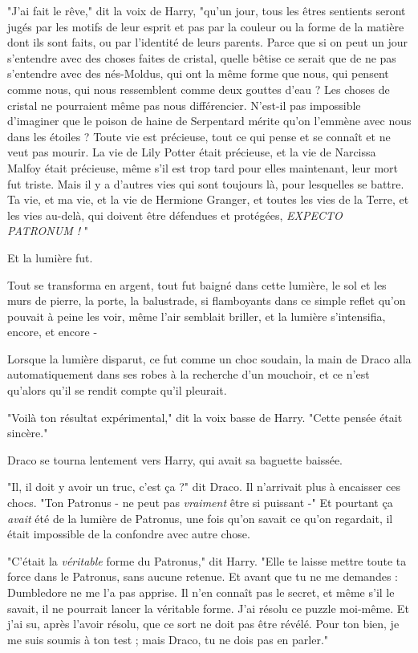 "J'ai fait le rêve," dit la voix de Harry, "qu'un jour, tous les êtres sentients seront jugés par les motifs de leur esprit et pas par la couleur ou la forme de la matière dont ils sont faits, ou par l'identité de leurs parents. Parce que si on peut un jour s'entendre avec des choses faites de cristal, quelle bêtise ce serait que de ne pas s'entendre avec des nés-Moldus, qui ont la même forme que nous, qui pensent comme nous, qui nous ressemblent comme deux gouttes d'eau ? Les choses de cristal ne pourraient même pas nous différencier. N'est-il pas impossible d'imaginer que le poison de haine de Serpentard mérite qu'on l'emmène avec nous dans les étoiles ? Toute vie est précieuse, tout ce qui pense et se connaît et ne veut pas mourir. La vie de Lily Potter était précieuse, et la vie de Narcissa Malfoy était précieuse, même s'il est trop tard pour elles maintenant, leur mort fut triste. Mais il y a d'autres vies qui sont toujours là, pour lesquelles se battre. Ta vie, et ma vie, et la vie de Hermione Granger, et toutes les vies de la Terre, et les vies au-delà, qui doivent être défendues et protégées, \emph{EXPECTO PATRONUM !} "

Et la lumière fut.

Tout se transforma en argent, tout fut baigné dans cette lumière, le sol et les murs de pierre, la porte, la balustrade, si flamboyants dans ce simple reflet qu'on pouvait à peine les voir, même l'air semblait briller, et la lumière s'intensifia, encore, et encore -

Lorsque la lumière disparut, ce fut comme un choc soudain, la main de Draco alla automatiquement dans ses robes à la recherche d'un mouchoir, et ce n'est qu'alors qu'il se rendit compte qu'il pleurait.

"Voilà ton résultat expérimental," dit la voix basse de Harry. "Cette pensée était sincère."

Draco se tourna lentement vers Harry, qui avait sa baguette baissée.

"Il, il doit y avoir un truc, c'est ça ?" dit Draco. Il n'arrivait plus à encaisser ces chocs. "Ton Patronus - ne peut pas \emph{vraiment}  être si puissant -" Et pourtant ça \emph{avait}  été de la lumière de Patronus, une fois qu'on savait ce qu'on regardait, il était impossible de la confondre avec autre chose.

"C'était la \emph{véritable } forme du Patronus," dit Harry. "Elle te laisse mettre toute ta force dans le Patronus, sans aucune retenue. Et avant que tu ne me demandes : Dumbledore ne me l'a pas apprise. Il n'en connaît pas le secret, et même s'il le savait, il ne pourrait lancer la véritable forme. J'ai résolu ce puzzle moi-même. Et j'ai su, après l'avoir résolu, que ce sort ne doit pas être révélé. Pour ton bien, je me suis soumis à ton test ; mais Draco, tu ne dois pas en parler."

